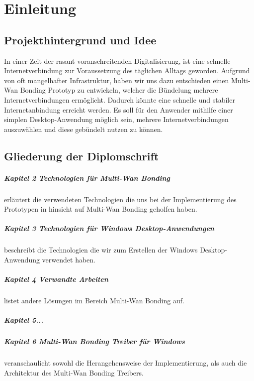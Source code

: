 \chapter{Einleitung}
\label{cha:Einleitung}

\section{Projekthintergrund und Idee}
In einer Zeit der rasant voranschreitenden Digitalisierung, ist eine schnelle Internetverbindung zur Voraussetzung des täglichen Alltags geworden. Aufgrund von oft mangelhafter Infrastruktur, haben wir uns dazu entschieden einen Multi-Wan Bonding Prototyp zu entwickeln, welcher die Bündelung mehrere Internetverbindungen ermöglicht. Dadurch könnte eine schnelle und stabiler Internetanbindung erreicht werden. Es soll für den Anwender mithilfe einer simplen Desktop-Anwendung möglich sein, mehrere Internetverbindungen auszuwählen und diese gebündelt nutzen zu können.
\section{Gliederung der Diplomschrift}
\paragraph{Kapitel 2 Technologien für Multi-Wan Bonding}erläutert die verwendeten Technologien die uns bei der Implementierung des Prototypen in hinsicht auf Multi-Wan Bonding geholfen haben.
\paragraph{Kapitel 3 Technologien für Windows Desktop-Anwendungen}beschreibt die Technologien die wir zum Erstellen der Windows Desktop-Anwendung verwendet haben.
\paragraph{Kapitel 4 Verwandte Arbeiten}listet andere Lösungen im Bereich Multi-Wan Bonding auf. 
\paragraph{Kapitel 5...}
\paragraph{Kapitel 6 Multi-Wan Bonding Treiber für Windows}veranschaulicht sowohl die Herangehensweise der Implementierung, als auch die Architektur des Multi-Wan Bonding Treibers.
